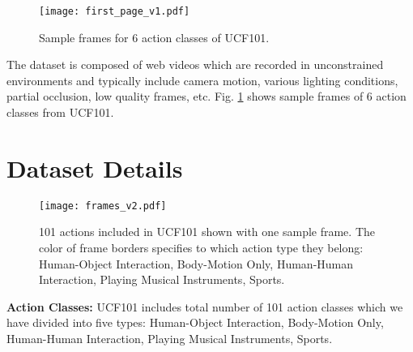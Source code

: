 \documentclass[10pt,twocolumn,letterpaper]{article}
\begin{document}
\begin{figure}
\begin{center}
   \texttt{[image: first\_page\_v1.pdf]}
\end{center}
   \caption{Sample frames for 6 action classes of UCF101.}
\label{fig:firstpage}
\end{figure}


The dataset is composed of web videos which are recorded in unconstrained environments and typically include
camera motion, various lighting conditions, partial occlusion, low quality frames, etc. Fig. \ref{fig:firstpage} shows sample frames of 6 action classes from UCF101.




\section{Dataset Details}



\begin{figure*}
\begin{center}
   \texttt{[image: frames\_v2.pdf]}
\end{center}
   \caption{101 actions included in UCF101 shown with one sample frame. The color of frame borders specifies to which action type they belong: {\color{NavyBlue} Human-Object Interaction}, {\color{red} Body-Motion Only}, {\color{RoyalPurple} Human-Human Interaction}, {\color{YellowOrange} Playing Musical Instruments}, {\color{ForestGreen} Sports}.}
\label{fig:frames}
\end{figure*}

\textbf{Action Classes:} UCF101 includes total number of 101 action classes which we have divided into five types: {\color{NavyBlue}Human-Object Interaction}, {\color{red}Body-Motion Only}, {\color{RoyalPurple} Human-Human Interaction}, {\color{YellowOrange}Playing Musical Instruments}, {\color{ForestGreen}Sports}.
\end{document}
